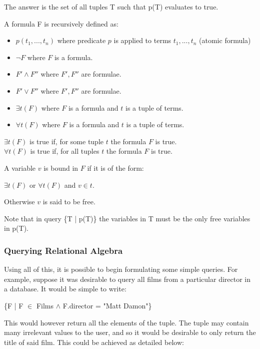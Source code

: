 \documentclass[a4paper, 11pt]{article}
\begin{document}
    The answer is the set of all tuples T such that p(T) evaluates to true.

    A formula F is recursively defined as:
    \begin{itemize}
      \item $p(t_1, ..., t_n)$ where predicate $p$ is applied to terms $t_1, ..., t_n$ (atomic formula)
        \item $\lnot F$ where $F$ is a formula.
        \item $F' \land F''$ where $F', F''$ are formulae.
        \item $F' \lor F''$ where $F', F''$ are formulae.
        \item $\exists t(F)$ where $F$ is a formula and $t$ is a tuple of terms.
        \item $\forall t(F)$ where $F$ is a formula and $t$ is a tuple of terms.
      \end{itemize}

      $\exists t(F)$ is true if, for some tuple $t$ the formula $F$ is true. \\
      $\forall t(F)$ is true if, for all tuples $t$ the formula $F$ is true.

      A variable $v$ is bound in $F$ if it is of the form:

      $\exists t(F)$ or $\forall t(F)$ and $v \in t$.

      Otherwise $v$ is said to be free.
      
      Note that in query \{T | p(T)\} the variables in T must be the only
      free variables in p(T).

    \subsubsection{Querying Relational Algebra}
      Using all of this, it is possible to begin formulating some simple
      queries. For example, suppose it was desirable to query all films from a
      particular director in a database. It would be simple to write:

      \begin{center}
        \{F | F $\in$ Films $\land$ F.director = "Matt Damon"\}
      \end{center}

      This would however return all the elements of the tuple. The tuple may
      contain many irrelevant values to the user, and so it would be desirable
      to only return the title of said film. This could be achieved as detailed
      below:
\end{document}
